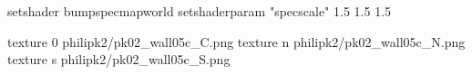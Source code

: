 setshader bumpspecmapworld
setshaderparam "specscale" 1.5 1.5 1.5

texture 0 philipk2/pk02_wall05c_C.png
texture n philipk2/pk02_wall05c_N.png
texture s philipk2/pk02_wall05c_S.png

